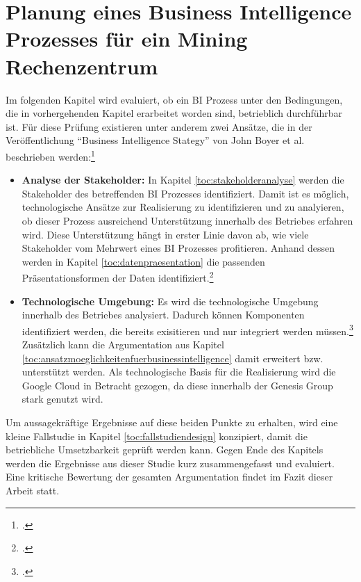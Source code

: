 \newpage
\section{Planung eines Business Intelligence Prozesses für ein Mining Rechenzentrum} \label{toc:planungeinesbiprozessesfuereinminingrechenzentrum}

Im folgenden Kapitel wird evaluiert, ob ein \ac{BI} Prozess unter den Bedingungen, die in vorhergehenden Kapitel erarbeitet
worden sind, betrieblich durchführbar ist. Für diese Prüfung existieren unter anderem zwei Ansätze, die in der Veröffentlichung
"`Business Intelligence Stategy"' von John Boyer et al. beschrieben werden:\footcite[Vgl.][S. 102]{boyer2010business}

\begin{itemize}
    \item \textbf{Analyse der Stakeholder: } In Kapitel \ref{toc:stakeholderanalyse} werden die Stakeholder des betreffenden
    \ac{BI} Prozesses identifiziert. Damit ist es möglich, technologische Ansätze zur Realisierung zu identifizieren
    und zu analyieren, ob dieser Prozess ausreichend Unterstützung innerhalb des Betriebes erfahren wird. Diese Unterstützung
    hängt in erster Linie davon ab, wie viele Stakeholder vom Mehrwert eines \ac{BI} Prozesses profitieren.
    Anhand dessen werden in Kapitel \ref{toc:datenpraesentation}
    die passenden Präsentationsformen der Daten identifiziert.\footcite[Vgl.][S. 102]{boyer2010business}
    \item \textbf{Technologische Umgebung: }Es wird die technologische Umgebung innerhalb des Betriebes analysiert.
    Dadurch können Komponenten identifiziert werden, die bereits exisitieren und nur integriert werden
    müssen.\footcite[Vgl.][S. 102]{boyer2010business} Zusätzlich
    kann die Argumentation aus Kapitel \ref{toc:ansatzmoeglichkeitenfuerbusinessintelligence} damit erweitert bzw. unterstützt
    werden. Als technologische Basis für die Realisierung wird die Google Cloud in Betracht gezogen, da diese innerhalb der
    Genesis Group stark genutzt wird.
\end{itemize}

Um aussagekräftige Ergebnisse auf diese beiden Punkte zu erhalten, wird eine kleine Fallstudie in Kapitel
\ref{toc:fallstudiendesign} konzipiert, damit die betriebliche Umsetzbarkeit geprüft werden kann. Gegen Ende des Kapitels werden die
Ergebnisse aus dieser Studie kurz zusammengefasst und evaluiert. Eine kritische Bewertung der gesamten Argumentation findet
im Fazit dieser Arbeit statt.

